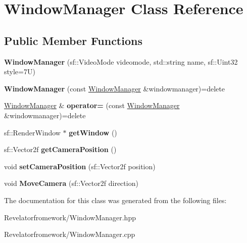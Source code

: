 \hypertarget{class_window_manager}{\section{Window\-Manager Class Reference}
\label{class_window_manager}
}
\subsection*{Public Member Functions}
\begin{DoxyCompactItemize}
\item 
\hypertarget{class_window_manager_a39b504521f91ffbabd88fa1e014d668d}{{\bfseries Window\-Manager} (sf\-::\-Video\-Mode videomode, std\-::string name, sf\-::\-Uint32 style=7\-U)}\label{class_window_manager_a39b504521f91ffbabd88fa1e014d668d}

\item 
\hypertarget{class_window_manager_aff6aee52b2c1ab9fe85027262b4b877f}{{\bfseries Window\-Manager} (const \hyperlink{class_window_manager}{Window\-Manager} \&windowmanager)=delete}\label{class_window_manager_aff6aee52b2c1ab9fe85027262b4b877f}

\item 
\hypertarget{class_window_manager_a11afbf3f6296341434679bbedb44c989}{\hyperlink{class_window_manager}{Window\-Manager} \& {\bfseries operator=} (const \hyperlink{class_window_manager}{Window\-Manager} \&windowmanager)=delete}\label{class_window_manager_a11afbf3f6296341434679bbedb44c989}

\item 
\hypertarget{class_window_manager_a7051ab4ec34157357d2fc029b5283ba0}{sf\-::\-Render\-Window $\ast$ {\bfseries get\-Window} ()}\label{class_window_manager_a7051ab4ec34157357d2fc029b5283ba0}

\item 
\hypertarget{class_window_manager_a6c6ca24d553fcbc205ca6eba14eea324}{sf\-::\-Vector2f {\bfseries get\-Camera\-Position} ()}\label{class_window_manager_a6c6ca24d553fcbc205ca6eba14eea324}

\item 
\hypertarget{class_window_manager_a5ee838ab6472ae7fcfd607831a8228d1}{void {\bfseries set\-Camera\-Position} (sf\-::\-Vector2f position)}\label{class_window_manager_a5ee838ab6472ae7fcfd607831a8228d1}

\item 
\hypertarget{class_window_manager_abbc66e888f2a67ab0203357005bc89d8}{void {\bfseries Move\-Camera} (sf\-::\-Vector2f direction)}\label{class_window_manager_abbc66e888f2a67ab0203357005bc89d8}

\end{DoxyCompactItemize}


The documentation for this class was generated from the following files\-:\begin{DoxyCompactItemize}
\item 
Revelatorfromework/Window\-Manager.\-hpp\item 
Revelatorfromework/Window\-Manager.\-cpp\end{DoxyCompactItemize}

